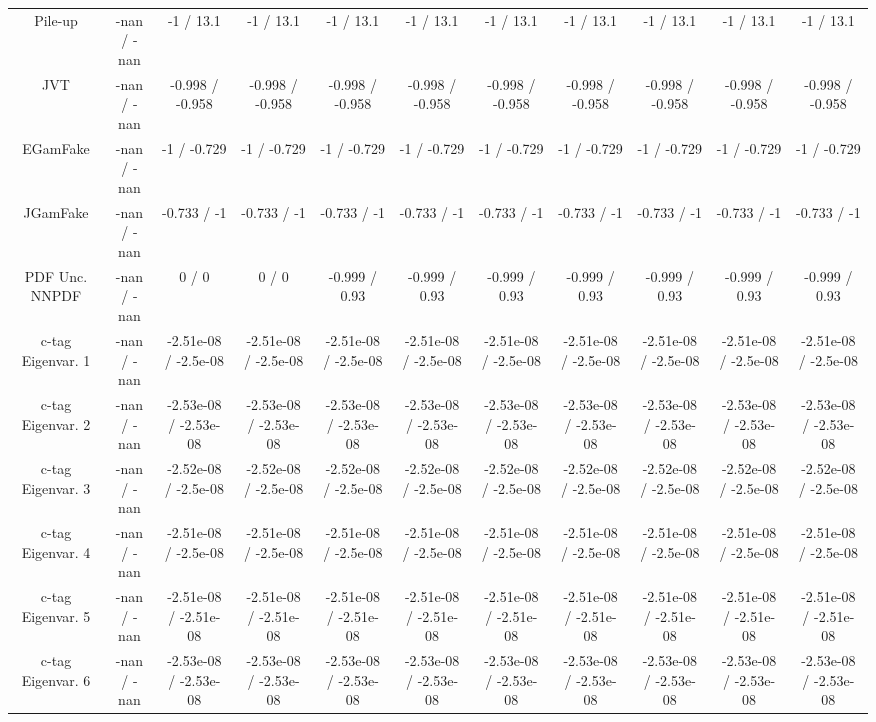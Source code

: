 \begin{table}[htbp]
\begin{center}
\begin{tabular}{|c|c|c|c|c|c|c|c|c|c|c|}
  Pile-up & -nan / -nan & -1 / 13.1 & -1 / 13.1 & -1 / 13.1 & -1 / 13.1 & -1 / 13.1 & -1 / 13.1 & -1 / 13.1 & -1 / 13.1 & -1 / 13.1 \\ 
  JVT & -nan / -nan & -0.998 / -0.958 & -0.998 / -0.958 & -0.998 / -0.958 & -0.998 / -0.958 & -0.998 / -0.958 & -0.998 / -0.958 & -0.998 / -0.958 & -0.998 / -0.958 & -0.998 / -0.958 \\ 
  EGamFake & -nan / -nan & -1 / -0.729 & -1 / -0.729 & -1 / -0.729 & -1 / -0.729 & -1 / -0.729 & -1 / -0.729 & -1 / -0.729 & -1 / -0.729 & -1 / -0.729 \\ 
  JGamFake & -nan / -nan & -0.733 / -1 & -0.733 / -1 & -0.733 / -1 & -0.733 / -1 & -0.733 / -1 & -0.733 / -1 & -0.733 / -1 & -0.733 / -1 & -0.733 / -1 \\ 
  PDF Unc. NNPDF & -nan / -nan & 0 / 0 & 0 / 0 & -0.999 / 0.93 & -0.999 / 0.93 & -0.999 / 0.93 & -0.999 / 0.93 & -0.999 / 0.93 & -0.999 / 0.93 & -0.999 / 0.93 \\ 
  c-tag Eigenvar. 1 & -nan / -nan & -2.51e-08 / -2.5e-08 & -2.51e-08 / -2.5e-08 & -2.51e-08 / -2.5e-08 & -2.51e-08 / -2.5e-08 & -2.51e-08 / -2.5e-08 & -2.51e-08 / -2.5e-08 & -2.51e-08 / -2.5e-08 & -2.51e-08 / -2.5e-08 & -2.51e-08 / -2.5e-08 \\ 
  c-tag Eigenvar. 2 & -nan / -nan & -2.53e-08 / -2.53e-08 & -2.53e-08 / -2.53e-08 & -2.53e-08 / -2.53e-08 & -2.53e-08 / -2.53e-08 & -2.53e-08 / -2.53e-08 & -2.53e-08 / -2.53e-08 & -2.53e-08 / -2.53e-08 & -2.53e-08 / -2.53e-08 & -2.53e-08 / -2.53e-08 \\ 
  c-tag Eigenvar. 3 & -nan / -nan & -2.52e-08 / -2.5e-08 & -2.52e-08 / -2.5e-08 & -2.52e-08 / -2.5e-08 & -2.52e-08 / -2.5e-08 & -2.52e-08 / -2.5e-08 & -2.52e-08 / -2.5e-08 & -2.52e-08 / -2.5e-08 & -2.52e-08 / -2.5e-08 & -2.52e-08 / -2.5e-08 \\ 
  c-tag Eigenvar. 4 & -nan / -nan & -2.51e-08 / -2.5e-08 & -2.51e-08 / -2.5e-08 & -2.51e-08 / -2.5e-08 & -2.51e-08 / -2.5e-08 & -2.51e-08 / -2.5e-08 & -2.51e-08 / -2.5e-08 & -2.51e-08 / -2.5e-08 & -2.51e-08 / -2.5e-08 & -2.51e-08 / -2.5e-08 \\ 
  c-tag Eigenvar. 5 & -nan / -nan & -2.51e-08 / -2.51e-08 & -2.51e-08 / -2.51e-08 & -2.51e-08 / -2.51e-08 & -2.51e-08 / -2.51e-08 & -2.51e-08 / -2.51e-08 & -2.51e-08 / -2.51e-08 & -2.51e-08 / -2.51e-08 & -2.51e-08 / -2.51e-08 & -2.51e-08 / -2.51e-08 \\ 
  c-tag Eigenvar. 6 & -nan / -nan & -2.53e-08 / -2.53e-08 & -2.53e-08 / -2.53e-08 & -2.53e-08 / -2.53e-08 & -2.53e-08 / -2.53e-08 & -2.53e-08 / -2.53e-08 & -2.53e-08 / -2.53e-08 & -2.53e-08 / -2.53e-08 & -2.53e-08 / -2.53e-08 & -2.53e-08 / -2.53e-08 \\ 

\end{tabular}
\end{center}
\end{table}
